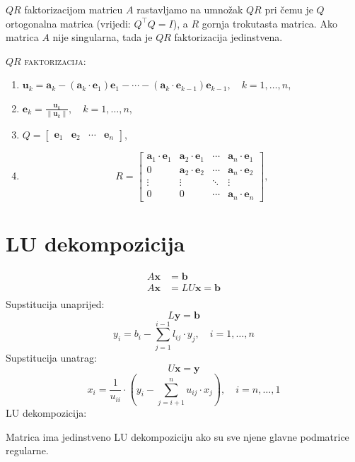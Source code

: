 \documentclass{article}
\begin{document}
$QR$ faktorizacijom matricu $A$ rastavljamo na umnožak $QR$ pri čemu je $Q$ ortogonalna matrica (vrijedi: $Q^\top Q = I$), a $R$ gornja trokutasta matrica. Ako matrica $A$ nije singularna, tada je $QR$ faktorizacija jedinstvena.

\textsc{$QR$ faktorizacija:}
\begin{enumerate}[\indent 1)]
  \item $\mathbf u_k = \mathbf a_k - (\mathbf a_k \cdot \mathbf e_1)\mathbf e_1 - \cdots - (\mathbf a_k \cdot \mathbf e_{k-1})\mathbf e_{k-1}, \quad k = 1, \ldots, n$,
  \item $\mathbf e_k = \frac{\mathbf u_k}{\|\mathbf u_k\|}, \quad k = 1, \ldots, n$,
  \item $Q = \begin{bmatrix} \mathbf e_1 & \mathbf e_2 & \cdots  & \mathbf e_n\end{bmatrix}$,
  \item $$R = 
  \begin{bmatrix}
  \mathbf a_1 \cdot \mathbf e_1 & \mathbf a_2 \cdot \mathbf e_1 & \cdots & \mathbf a_n \cdot \mathbf e_1 \\
  0 & \mathbf a_2 \cdot \mathbf e_2 & \cdots & \mathbf a_n \cdot \mathbf e_2 \\
  \vdots & \vdots & \ddots & \vdots \\
  0 & 0  & \cdots & \mathbf a_n \cdot \mathbf e_n
  \end{bmatrix},$$
\end{enumerate}

\section{LU dekompozicija}
\begin{align*}
A\mathbf x &= \mathbf b\\
A\mathbf x &= LU\mathbf x = \mathbf b\\
\end{align*}
Supstitucija unaprijed:
$$L\mathbf y = \mathbf b$$
$$y_i = b_i - \sum\limits_{j=1}^{i-1}l_{ij}\cdot y_j, \quad i = 1, \ldots, n$$
Supstitucija unatrag:
$$U\mathbf x = \mathbf y$$
$$x_i = \frac{1}{u_{ii}}\cdot \left ( y_i - \sum\limits_{j=i+1}^n u_{ij}\cdot x_j\right ), \quad i = n, \ldots, 1$$
LU dekompozicija:
\begin{algorithmic}
        \EndFor
    \EndFor
  \EndFor
\end{algorithmic}
Matrica ima jedinstveno LU dekompoziciju ako su sve njene glavne podmatrice regularne.
\end{document}
